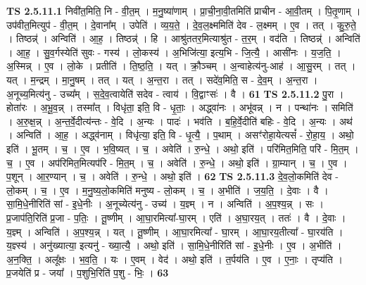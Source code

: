 \documentclass[17pt]{extarticle}
\begin{document}
                                \textbf{ TS 2.5.11.1} \newline
                  निवी॑त॒मिति॒ नि - वी॒त॒म् । म॒नु॒ष्या॑णाम् । प्रा॒ची॒ना॒वी॒तमिति॑ प्राचीन - आ॒वी॒तम् । पि॒तृ॒णाम् । उप॑वीत॒मित्युप॑ - वी॒त॒म् । दे॒वाना᳚म् । उपेति॑ । व्य॒य॒ते॒ । दे॒व॒ल॒क्ष्ममिति॑ देव - ल॒क्ष्मम् । ए॒व । तत् । कु॒रु॒ते॒ । तिष्ठन्न्॑ । अन्विति॑ । आ॒ह॒ । तिष्ठन्न्॑ । हि । आश्रु॑ततर॒मित्याश्रु॑त - त॒र॒म् । वद॑ति । तिष्ठन्न्॑ । अन्विति॑ । आ॒ह॒ । सु॒व॒र्गस्येति॑ सुवः - गस्य॑ । लो॒कस्य॑ । अ॒भिजि॑त्या॒ इत्य॒भि - जि॒त्यै॒ । आसी॑नः । य॒ज॒ति॒ । अ॒स्मिन्न् । ए॒व । लो॒के । प्रतीति॑ । ति॒ष्ठ॒ति॒ । यत् । क्रौ॒ञ्चम् । अ॒न्वाहेत्य॑नु-आह॑ । आ॒सु॒रम् । तत् । यत् । म॒न्द्रम् । मा॒नु॒षम् । तत् । यत् । अ॒न्त॒रा । तत् । सदे॑व॒मिति॒ स - दे॒व॒म् । अ॒न्त॒रा । अ॒नूच्य॒मित्य॑नु - उच्य᳚म् । स॒दे॒व॒त्वायेति॑ सदेव - त्वाय॑ । वि॒द्वाꣳसः॑ । वै । \textbf{  61} \newline
                  \newline
                                \textbf{ TS 2.5.11.2} \newline
                  पु॒रा । होता॑रः । अ॒भू॒व॒न्न् । तस्मा᳚त् । विधृ॑ता॒ इति॒ वि - धृ॒ताः॒ । अद्ध्वा॑नः । अभू॑वन्न् । न । पन्था॑नः । समिति॑ । अ॒रु॒क्ष॒न्न् । अ॒न्त॒र्वे॒दीत्य॑न्तः - वे॒दि । अ॒न्यः । पादः॑ । भव॑ति । ब॒हि॒र्वे॒दीति॑ बहिः - वे॒दि । अ॒न्यः । अथ॑ । अन्विति॑ । आ॒ह॒ । अद्ध्व॑नाम् । विधृ॑त्या॒ इति॒ वि - धृ॒त्यै॒ । प॒थाम् । असꣳ॑रोहा॒येत्यसं᳚ - रो॒हा॒य॒ । अथो॒ इति॑ । भू॒तम् । च॒ । ए॒व । भ॒वि॒ष्यत् । च॒ । अवेति॑ । रु॒न्धे॒ । अथो॒ इति॑ । परि॑मित॒मिति॒ परि॑ - मि॒त॒म् । च॒ । ए॒व । अप॑रिमित॒मित्यप॑रि - मि॒त॒म् । च॒ । अवेति॑ । रु॒न्धे॒ । अथो॒ इति॑ । ग्रा॒म्यान् । च॒ । ए॒व । प॒शून् । आ॒र॒ण्यान् । च॒ । अवेति॑ । रु॒न्धे॒ । अथो॒ इति॑ । \textbf{  62} \newline
                  \newline
                                \textbf{ TS 2.5.11.3} \newline
                  दे॒व॒लो॒कमिति॑ देव - लो॒कम् । च॒ । ए॒व । म॒नु॒ष्य॒लो॒कमिति॑ मनुष्य - लो॒कम् । च॒ । अ॒भीति॑ । ज॒य॒ति॒ । दे॒वाः । वै । सा॒मि॒धे॒नीरिति॑ सां - इ॒धे॒नीः । अ॒नूच्येत्य॑नु - उच्य॑ । य॒ज्ञ्म् । न । अन्विति॑ । अ॒प॒श्य॒न्न् । सः । प्र॒जाप॑ति॒रिति॑ प्र॒जा - प॒तिः॒ । तू॒ष्णीम् । आ॒घा॒रमित्या᳚-घा॒रम् । एति॑ । अ॒घा॒रय॒त् । ततः॑ । वै । दे॒वाः । य॒ज्ञ्म् । अन्विति॑ । अ॒प॒श्य॒न्न् । यत् । तू॒ष्णीम् । आ॒घा॒रमित्या᳚ - घा॒रम् । आ॒घा॒रय॒तीत्या᳚ - घा॒रय॑ति । य॒ज्ञ्स्य॑ । अनु॑ख्यात्या॒ इत्यनु॑ - ख्या॒त्यै॒ । अथो॒ इति॑ । सा॒मि॒धे॒नीरिति॑ सां - इ॒धे॒नीः । ए॒व । अ॒भीति॑ । अ॒न॒क्ति॒ । अलू᳚क्षः । भ॒व॒ति॒ । यः । ए॒वम् । वेद॑ । अथो॒ इति॑ । त॒र्पय॑ति । ए॒व । ए॒नाः॒ । तृप्य॑ति । प्र॒जयेति॑ प्र - जया᳚ । प॒शुभि॒रिति॑ प॒शु - भिः॒ । \textbf{  63} \newline
\end{document}
